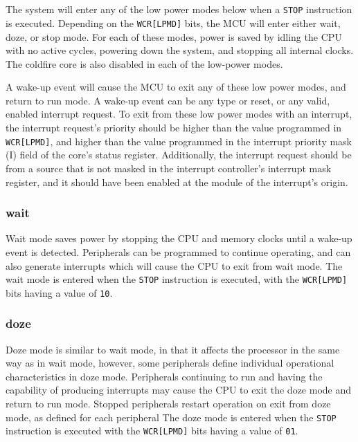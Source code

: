 \section{}
\subsection*{}
The system will enter any of the low power modes below when a \texttt{STOP}
instruction is executed. Depending on the \texttt{WCR[LPMD]} bits, the MCU will
enter either wait, doze, or stop mode.
For each of these modes, power is saved by idling the CPU with no active
cycles, powering down the system, and stopping all internal clocks. The coldfire
core is also disabled in each of the low-power modes. 

A wake-up event will cause the MCU to exit any of these low power modes, and
return to run mode. A wake-up event can be any type or reset, or any valid,
enabled interrupt request. To exit from these low power modes with an interrupt,
the interrupt request's priority should be higher than the value programmed in
\texttt{WCR[LPMD]}, and higher than the value programmed in the interrupt
priority mask (I) field of the core’s status register. Additionally, the
interrupt request should be from a source that is not masked in the interrupt
controller’s interrupt mask register, and it should have been enabled at the
module of the interrupt’s origin.

\subsubsection*{wait} 
Wait mode saves power by stopping the CPU and memory clocks until a wake-up
event is detected. Peripherals can be programmed to continue operating, and can
also generate interrupts which will cause the CPU to exit from wait mode. The
wait mode is entered when the \texttt{STOP} instruction is executed, with the
\texttt{WCR[LPMD]} bits having a value of \texttt{10}.

\subsubsection*{doze} 
Doze mode is similar to wait mode, in that it affects the
processor in the same way as in wait mode, however, some peripherals define
individual operational characteristics in doze mode. Peripherals continuing to
run and having the capability of producing interrupts may cause the CPU to exit
the doze mode and return to run mode. Stopped peripherals restart operation on
exit from doze mode, as defined for each peripheral
The doze mode is entered when the \texttt{STOP} instruction is executed with the
\texttt{WCR[LPMD]} bits having a value of \texttt{01}.

